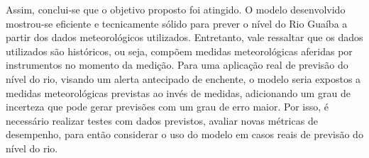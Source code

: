 Assim, conclui-se que o objetivo proposto foi atingido. O modelo desenvolvido mostrou-se eficiente e tecnicamente sólido para prever o nível do Rio Guaíba a partir dos dados meteorológicos utilizados. Entretanto, vale ressaltar que os dados utilizados são históricos, ou seja, compõem medidas meteorológicas aferidas por instrumentos no momento da medição. Para uma aplicação real de previsão do nível do rio, visando um alerta antecipado de enchente, o modelo seria expostos a medidas meteorológicas previstas ao invés de medidas, adicionando um grau de incerteza que pode gerar previsões com um grau de erro maior. Por isso, é necessário realizar testes com dados previstos, avaliar novas métricas de desempenho, para então considerar o uso do modelo em casos reais de previsão do nível do rio.  
